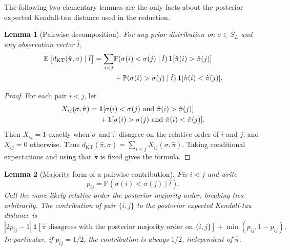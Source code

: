 \documentclass[11pt]{article}
\newtheorem{lemma}{Lemma}
\newcommand{\E}{\mathbb{E}}
\newcommand{\Prb}{\mathbb{P}}
\newcommand{\ind}{\mathbf{1}}
\newcommand{\KT}{\operatorname{KT}}
\begin{document}
The following two elementary lemmas are the only facts about the posterior expected Kendall-tau distance used in the reduction.

\begin{lemma}[Pairwise decomposition]\label{lem:pairwise}
For any prior distribution on $\sigma\in S_L$ and any observation vector $\hat t$,
\begin{align}
  \E\left[d_{\KT}(\hat\pi,\sigma)\mid \hat t\right]
  =\sum_{i<j} &\Prb(\sigma(i)<\sigma(j)\mid \hat t)\,\ind[\hat\pi(i)>\hat\pi(j)] \notag\\
  &+\Prb(\sigma(i)>\sigma(j)\mid \hat t)\,\ind[\hat\pi(i)<\hat\pi(j)].
\end{align}
\end{lemma}

\begin{proof}
For each pair $i<j$, let
\begin{align}
  X_{ij}(\sigma,\hat\pi)
  ={}&\ind[\sigma(i)<\sigma(j)\text{ and }\hat\pi(i)>\hat\pi(j)] \notag\\
   &+\ind[\sigma(i)>\sigma(j)\text{ and }\hat\pi(i)<\hat\pi(j)].
\end{align}
Then $X_{ij}=1$ exactly when $\sigma$ and $\hat\pi$ disagree on the relative order of $i$ and $j$, and $X_{ij}=0$ otherwise.  Thus $d_{\KT}(\hat\pi,\sigma)=\sum_{i<j}X_{ij}(\sigma,\hat\pi)$.  Taking conditional expectations and using that $\hat\pi$ is fixed gives the formula.
\end{proof}

\begin{lemma}[Majority form of a pairwise contribution]\label{lem:majority}
Fix $i<j$ and write
\begin{equation}
  p_{ij}=\Prb(\sigma(i)<\sigma(j)\mid \hat t).
\end{equation}
Call the more likely relative order the posterior majority order, breaking ties arbitrarily.  The contribution of pair $\{i,j\}$ to the posterior expected Kendall-tau distance is
\begin{equation}
  |2p_{ij}-1|\,\ind[\hat\pi\text{ disagrees with the posterior majority order on }\{i,j\}]
  +\min(p_{ij},1-p_{ij}).
\end{equation}
In particular, if $p_{ij}=1/2$, the contribution is always $1/2$, independent of $\hat\pi$.
\end{lemma}
\end{document}
